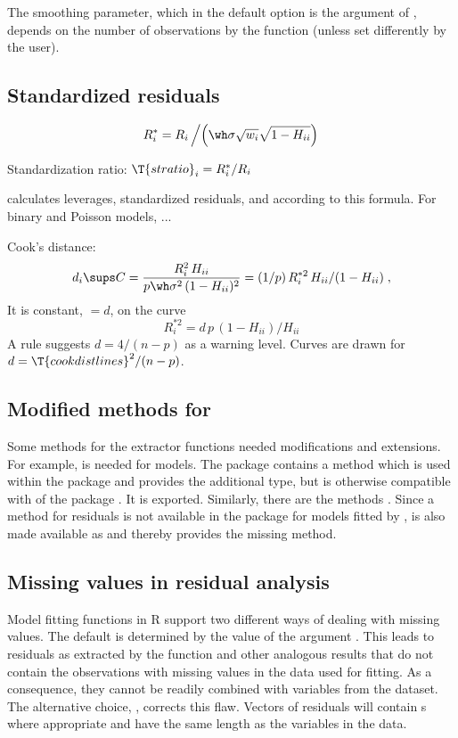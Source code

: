 \documentclass[11pt]{article}
\begin{document}
The smoothing parameter, which in the default option is the 
argument of , depends on the number of observations by the function
 (unless set differently by the user).

\subsection{Standardized residuals}

\[
R^*_i=R_i\left/\left(\wh\sigma \sqrt{w_i} \sqrt{1-H_{ii}}\right)\right.
\]

Standardization ratio: 
$\T{stratio}_i=R^*_i/R_i$

 calculates leverages, standardized residuals, and 
according to this formula.
For binary and Poisson models, ...

Cook's distance:
\[
  d_i\sups C=\frac{R_i^2\,H_{ii}}{p\wh\sigma^2\,(1-H_{ii})^2}
  =(1/p)\,R_i^{*2}\,H_{ii}/(1-H_{ii})
  \;,
\]
It is constant, $=d$, on the curve
\[
  R_i^{*2} = d\,p\,(1-H_{ii})/H_{ii}
\]
A rule suggests $d=4/(n-p)$ as a warning level.
Curves are drawn for $d=\T{cookdistlines}^2/(n-p)$.

\subsection{Modified methods for }
%
Some methods for the extractor functions 
needed modifications and extensions.
For example,  is needed for  models.
The package contains a method  which is used within the
package and provides the additional type, but is otherwise compatible with
 of the package . It is exported.
Similarly, there are the methods
.
Since a method for residuals is not available in the  package
for models fitted by , \Hneed{70mm} is also
made available as  and thereby provides the missing
method. 


\subsection{Missing values in residual analysis}
Model fitting functions in R support two different ways of dealing with
missing values. The default is determined by the value 
of the argument . 
This leads to residuals as extracted by the  function
and other analogous results that do not contain the observations with 
missing values in the data used for fitting.
As a consequence, they cannot be readily combined with variables from the
dataset. 
The alternative choice, , corrects this flaw.
Vectors of residuals will contain s where appropriate and have 
the same length as the variables in the data.
\end{document}
